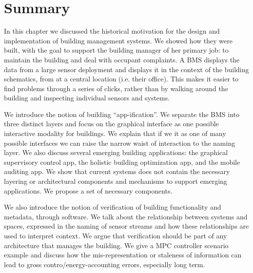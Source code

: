 
\section{Summary}


In this chapter we discussed the historical motivation for the design and implementation of building management systems.
We showed how they were built, with the goal to support the building manager of her primary job: to maintain the 
building and deal with occupant complaints.  A BMS displays the data from a large sensor deployment and displays it in the
context of the building schematics, from at a central location (i.e. their office).  This makes it easier to  
find problems through a series of clicks, rather than by  walking around the building and inspecting
individual sensors and systems.

We introduce the notion of building ``app-ification''.  We separate the BMS into three distinct layers
and focus on the graphical interface as one possible interactive modality for buildings.  We explain that if we
it as one of many possible interfaces we can raise the narrow waist of interaction to the naming layer.  We also discuss
several emerging building applications: the graphical supervisory control app, the holistic building optimization app,
and the mobile auditing app.  We show that current systems does not contain the necessary layering or architectural components
and mechanisms to support emerging applications.  We propose a set of necessary components.

We also introduce the notion of verification of building functionality and metadata, through software.  We talk about the
relationship between systems and spaces, expressed in the naming of sensor streams and how these relationships are used
to interpret context.  We argue that verification should be part of any
architecture that manages the building.  We give a MPC controller scenario example and discuss how the mis-representation or
staleness of information can lead to gross contro/energy-accounting errors, especially long term.

